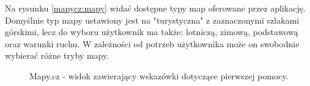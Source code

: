 Na rysunku \ref{mapycz:mapy} widać dostępne typy map oferowane przez aplikację. Domyślnie typ mapy ustawiony jest na "turystyczna" z zaznaczonymi szlakami górskimi, lecz do wyboru użytkownik ma także: lotniczą, zimową, podstawową oraz warunki ruchu. W zależności od potrzeb użytkownika może on swobodnie wybierać różne tryby mapy. 
\begin{figure}[H]
    \centering
    \caption{Mapy.cz - widok zawierający wskazówki dotyczące pierwszej pomocy.}
    \label{mapycz:pomoc}
\end{figure}

